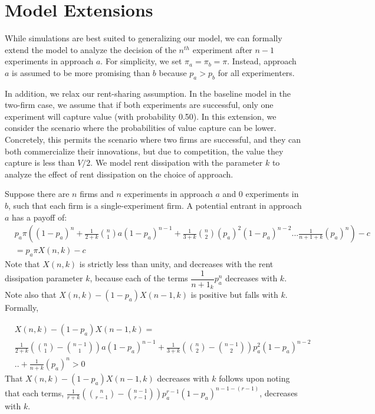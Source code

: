 \section{Model Extensions}\label{app:proofs}

While simulations are best suited to generalizing our model, we can formally extend the model to analyze the decision of the $n^{th}$ experiment after $n-1$ experiments in approach $a$. For simplicity, we set $\pi_a = \pi_b = \pi$. Instead, approach $a$ is assumed to be more promising than $b$ because $p_a > p_b$ for all experimenters.

In addition, we relax our rent-sharing assumption. In the baseline model in the two-firm case, we assume that if both experiments are successful, only one experiment will capture value (with probability 0.50). In this extension, we consider the scenario where the probabilities of value capture can be lower. Concretely, this permits the scenario where two firms are successful, and they can both commercialize their innovations, but due to competition, the value they capture is less than $V/2$. We model rent dissipation with the parameter $k$ to analyze the effect of rent dissipation on the choice of approach.


Suppose there are $n$ firms and $n$ experiments in approach $a$ and 0 experiments in $b$, such that each firm is a single-experiment firm. A potential entrant in approach $a$ has a payoff of:
\begin{equation} \label{eq: n in A A}
\begin{aligned}
    &p_a \pi \left((1-p_a)^n + \frac{1}{2+k}{n \choose 1}a(1-p_a)^{n-1} +\frac{1}{3+k}{n \choose 2}(p_a)^2(1-p_a)^{n-2} ... \frac{1}{n+1 + k}(p_a)^n \right) -c  \\
    &= p_a \pi X(n,k) - c
\end{aligned}
\end{equation}
Note that $X(n,k)$ is strictly less than unity, and decreases with the rent dissipation parameter $k$, because each of the terms $\dfrac{1}{n+1_k}p_a^n$ decreases with $k$. Note also that $X(n,k) - (1-p_a)X(n-1,k)$ is positive but falls with $k$. Formally,

\begin{equation} 
\begin{aligned}
&X(n,k) - (1-p_a)X(n-1,k) = \\
&\frac{1}{2+k}\left({n \choose 1}-{n-1 \choose 1}\right)a(1-p_a)^{n-1} + 
\frac{1}{3+k}\left({n \choose 2}-{n-1 \choose 2}\right)p_a^2(1-p_a)^{n-2} \\
&.. + \frac{1}{n+k}(p_a)^n > 0
\end{aligned}
\end{equation}
That $X(n,k) - (1-p_a)X(n-1,k)$ decreases with $k$ follows upon noting that each terms, $\frac{1}{r+k}\left({n \choose r-1}-{n-1 \choose r-1}\right)p_a^{r-1}(1-p_a)^{n-1 - (r-1)}$, decreases with $k$.

